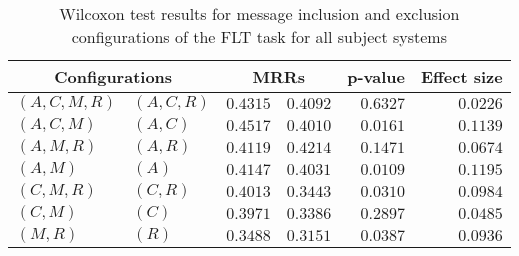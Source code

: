 
\begin{table}
\begin{spacing}{1.2}
\centering
\caption{Wilcoxon test results for message inclusion and exclusion configurations of the FLT task for all subject systems}
\label{table:versus-wilcox-all-flt-message}
\begin{tabular}{ll|rr|rr}
\toprule
      \multicolumn{2}{c|}{Configurations} &          \multicolumn{2}{c|}{MRRs} &       p-value & Effect size \\
\midrule
 $(A,C,M,R)$ &  $(A,C,R)$ & $0.4315$ & $0.4092$ & $0.6327$ &    $0.0226$ \\
   $(A,C,M)$ &    $(A,C)$ & $0.4517$ & $0.4010$ & $0.0161$ &    $0.1139$ \\
   $(A,M,R)$ &    $(A,R)$ & $0.4119$ & $0.4214$ & $0.1471$ &    $0.0674$ \\
     $(A,M)$ &      $(A)$ & $0.4147$ & $0.4031$ & $0.0109$ &    $0.1195$ \\
   $(C,M,R)$ &    $(C,R)$ & $0.4013$ & $0.3443$ & $0.0310$ &    $0.0984$ \\
     $(C,M)$ &      $(C)$ & $0.3971$ & $0.3386$ & $0.2897$ &    $0.0485$ \\
     $(M,R)$ &      $(R)$ & $0.3488$ & $0.3151$ & $0.0387$ &    $0.0936$ \\
\bottomrule
\end{tabular}

\end{spacing}
\end{table}

